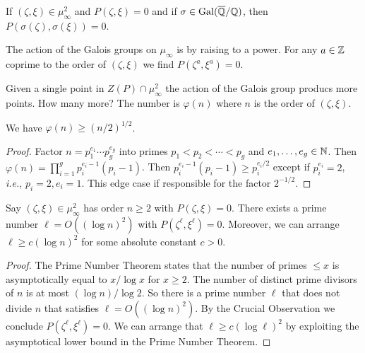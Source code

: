\begin{crucial}
  If $(\zeta,\xi)\in \mu_\infty^2$ and $P(\zeta,\xi)=0$ and if
  $\sigma\in \mathrm{Gal}({\overline{\mathbb{Q}}}/{\mathbb{Q}})$, then
  $P(\sigma(\zeta),\sigma(\xi))=0$.

  The action of the Galois groups on $\mu_\infty$ is by raising to a
  power. For any $a\in{\mathbb{Z}}$ coprime to the order of $(\zeta,\xi)$  
  we find $P(\zeta^a,\xi^a)=0$. 
\end{crucial}

Given a single point in $Z(P)\cap\mu_\infty^2$ the action of the
Galois group producs more points. How many more? The number is
$\varphi(n)$ where $n$ is the order of $(\zeta,\xi)$. 

\begin{lemma}
  \label{lem:lgo}
  We have $\varphi(n) \ge (n/2)^{1/2}$. 
\end{lemma}
\begin{proof}
  Factor $n=p_1^{e_1}\cdots p_g^{e_g}$ into primes $p_1<p_2<\cdots <
  p_g$ and $e_1,\ldots,e_g\in{\mathbb{N}}$. Then $\varphi(n) = \prod_{i=1}^g
  p_i^{e_i-1}(p_i-1)$. Then $p_i^{e_i-1}(p_i-1)\ge p_i^{e_i/2}$ except
  if $p_i^{e_i}=2$, \textit{i.e.}, $p_i=2,e_i=1$. This edge case if
  responsible for the
  factor $2^{-1/2}$. 
\end{proof}


\begin{lemma}
  Say $(\zeta,\xi)\in \mu_\infty^2$ has order $n\ge 2$
  with $P(\zeta,\xi)=0$. There exists a prime number $\ell=O((\log
  n)^2)$ with $P(\zeta^\ell,\xi^\ell)=0$.
  Moreover, we can arrange $\ell \ge c (\log n)^2$ for some
  absolute constant $c>0$. 
\end{lemma}
\begin{proof}
  The Prime Number Theorem states that the number of primes $\le x$ is
  asymptotically equal to $x/\log x$ for $x\ge 2$.
  The number of
  distinct prime divisors of $n$ is at most $(\log n)/\log 2$.
  So there is a  prime number $\ell$ that does not divide $n$
  that satisfies $\ell =
  O((\log n)^2)$. By the Crucial Observation we conclude
  $P(\zeta^\ell,\xi^\ell)=0$.
  We can arrange that $\ell\ge c(\log\ell)^2$ by exploiting the
  asymptotical lower bound in the Prime Number Theorem.
\end{proof}

